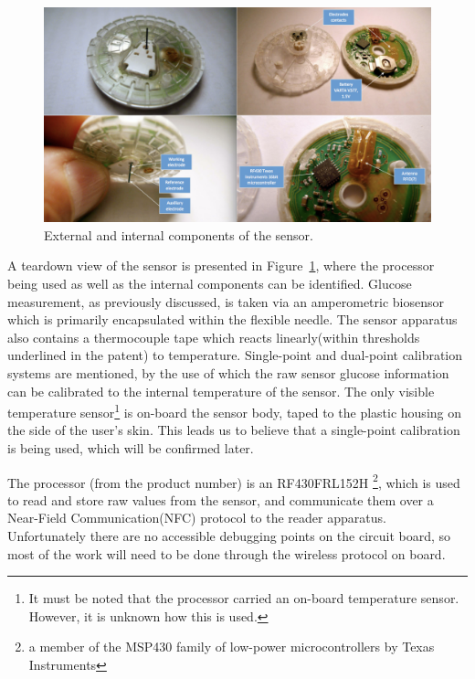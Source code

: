 \begin{figure}[ht]
\centering\includegraphics[width=1.0\linewidth]{images/libre4}
\caption{External and internal components of the sensor\cite{ilka_freestyle_2014}.}
\label{fig:libre2}
\end{figure}

A teardown view of the sensor is presented in Figure~\ref{fig:libre2}, where the processor being used as well as the internal components can be identified. Glucose measurement, as previously discussed, is taken via an amperometric biosensor which is primarily encapsulated within the flexible needle. The sensor apparatus also contains a thermocouple tape \cite{noauthor_thermocouple_1971} which reacts linearly(within thresholds underlined in the patent) to temperature. Single-point and dual-point calibration systems are mentioned, by the use of which the raw sensor glucose information can be calibrated to the internal temperature of the sensor. The only visible temperature sensor\footnote{It must be noted that the processor carried an on-board temperature sensor. However, it is unknown how this is used.} is on-board the sensor body, taped to the plastic housing on the side of the user's skin. This leads us to believe that a single-point calibration is being used, which will be confirmed later.

The processor (from the product number) is an  RF430FRL152H\cite{noauthor_rf430frl152h_nodate}
\footnote{a member of the MSP430\cite{noauthor_16-bit_nodate} family of low-power microcontrollers by Texas Instruments}, which is used to read and store raw values from the sensor, and communicate them over a Near-Field Communication(NFC)\cite{noauthor_near-field_2017} protocol to the reader apparatus. Unfortunately there are no accessible debugging points on the circuit board, so most of the work will need to be done through the wireless protocol on board.

